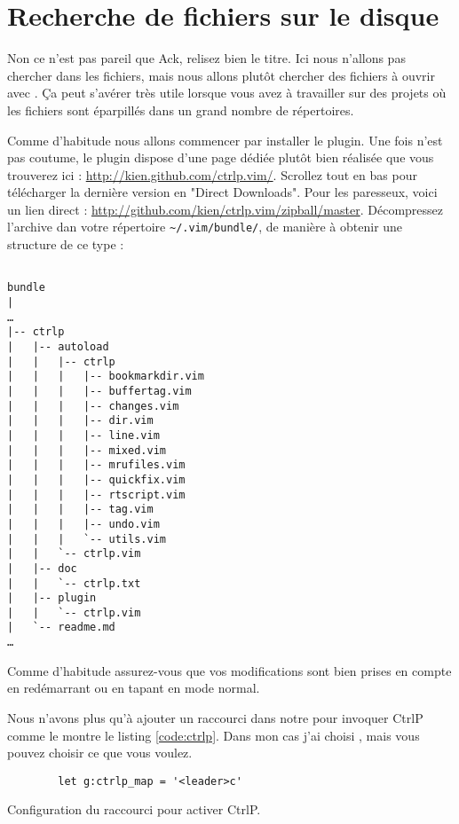 \section{Recherche de fichiers sur le disque}

Non ce n'est pas pareil que Ack, relisez bien le titre. Ici nous n'allons pas chercher dans les fichiers, mais nous allons plutôt chercher des fichiers à ouvrir avec \vim. Ça peut s'avérer très utile lorsque vous avez à travailler sur des projets où les fichiers sont éparpillés dans un grand nombre de répertoires.

Comme d'habitude nous allons commencer par installer le plugin. Une fois n'est pas coutume, le plugin dispose d'une page dédiée plutôt bien réalisée que vous trouverez ici : \url{http://kien.github.com/ctrlp.vim/}. Scrollez tout en bas pour télécharger la dernière version en "Direct Downloads". Pour les paresseux, voici un lien direct : \url{http://github.com/kien/ctrlp.vim/zipball/master}. Décompressez l'archive dan votre répertoire \Verb|~/.vim/bundle/|, de manière à obtenir une structure de ce type :

\begin{verbatim}

bundle
|
…
|-- ctrlp
|   |-- autoload
|   |   |-- ctrlp
|   |   |   |-- bookmarkdir.vim
|   |   |   |-- buffertag.vim
|   |   |   |-- changes.vim
|   |   |   |-- dir.vim
|   |   |   |-- line.vim
|   |   |   |-- mixed.vim
|   |   |   |-- mrufiles.vim
|   |   |   |-- quickfix.vim
|   |   |   |-- rtscript.vim
|   |   |   |-- tag.vim
|   |   |   |-- undo.vim
|   |   |   `-- utils.vim
|   |   `-- ctrlp.vim
|   |-- doc
|   |   `-- ctrlp.txt
|   |-- plugin
|   |   `-- ctrlp.vim
|   `-- readme.md
…
\end{verbatim}

Comme d'habitude assurez-vous que vos modifications sont bien prises en compte en redémarrant \vim ou en tapant  en mode normal.

Nous n'avons plus qu'à ajouter un raccourci dans notre \vimrc pour invoquer CtrlP comme le montre le listing \ref{code:ctrlp}. Dans mon cas j'ai choisi , mais vous pouvez choisir ce que vous voulez.

\begin{listing}[H]

    \begin{verbatim}
        let g:ctrlp_map = '<leader>c'
    \end{verbatim}
    \caption{Configuration du raccourci pour activer CtrlP.}
    \label{code:ctrlp}
\end{listing}

